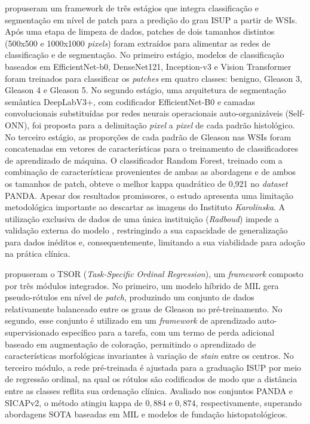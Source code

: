  propuseram um framework de três estágios que integra classificação e segmentação em nível de patch para a predição do grau ISUP a partir de WSIs. Após uma etapa de limpeza de dados, patches de dois tamanhos distintos (500x500 e 1000x1000 \textit{pixels}) foram extraídos para alimentar as redes de classificação e de segmentação. No primeiro estágio, modelos de classificação baseados em EfficientNet-b0, DenseNet121, Inception-v3 e Vision Transformer foram treinados para classificar os \textit{patches} em quatro classes: benigno, Gleason 3, Gleason 4 e Gleason 5. No segundo estágio, uma arquitetura de segmentação semântica DeepLabV3+, com codificador EfficientNet-B0 e camadas convolucionais substituídas por redes neurais operacionais auto-organizáveis (Self-ONN), foi proposta para a delimitação \textit{pixel} a \textit{pixel} de cada padrão histológico. No terceiro estágio, as proporções de cada padrão de Gleason nas WSIs foram concatenadas em vetores de características para o treinamento de classificadores de aprendizado de máquina. O classificador Random Forest, treinado com a combinação de características provenientes de ambas as abordagens e de ambos os tamanhos de patch, obteve o melhor kappa quadrático de 0,921 no \textit{dataset} PANDA. Apesar dos resultados promissores, o estudo apresenta uma limitação metodológica importante ao descartar as imagens do Instituto \textit{Karolinska}. A utilização exclusiva de dados de uma única instituição (\textit{Radboud}) impede a validação externa do modelo , restringindo a sua capacidade de generalização para dados inéditos e, consequentemente, limitando a sua viabilidade para adoção na prática clínica.

 propuseram o TSOR (\textit{Task-Specific Ordinal Regression}), um \textit{framework} composto por três módulos integrados. No primeiro, um modelo híbrido de MIL gera pseudo-rótulos em nível de \textit{patch}, produzindo um conjunto de dados relativamente balanceado entre os graus de Gleason no pré-treinamento. No segundo, esse conjunto é utilizado em um \textit{framework} de aprendizado auto-supervisionado específico para a tarefa, com um termo de perda adicional baseado em augmentação de coloração, permitindo o aprendizado de características morfológicas invariantes à variação de \textit{stain} entre os centros. No terceiro módulo, a rede pré-treinada é ajustada para a graduação ISUP por meio de regressão ordinal, na qual os rótulos são codificados de modo que a distância entre as classes reflita sua ordenação clínica. Avaliado nos conjuntos PANDA e SICAPv2, o método atingiu kappa de $0{,}884$ e $0{,}874$, respectivamente, superando abordagens SOTA baseadas em MIL e modelos de fundação histopatológicos.

